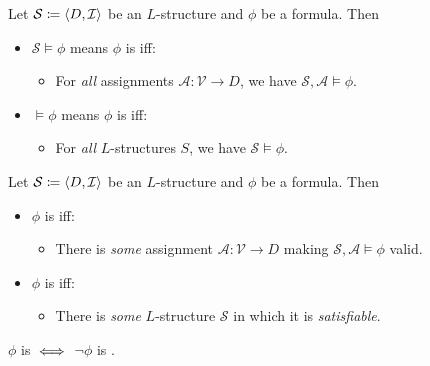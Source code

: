 \begin{definition}[Validity]
    Let $\mathcal{S} \coloneqq \langle {D, \mathcal{I}} \rangle$ be an $L$-structure 
    and $\phi$ be a formula. Then
    
    \begin{itemize}
        \item $\mathcal{S} \models \phi$ \quad means $\phi$ is
             iff:
            \begin{itemize}
                \item For \textit{all} assignments 
                    $\mathcal{A} \colon \mathcal{V} \to D$, we have 
                    $\mathcal{S}, \mathcal{A} \models \phi$.
            \end{itemize}
        \item $\models \phi$ \quad means $\phi$ is  iff:
            \begin{itemize}
                \item For \textit{all} $L$-structures $S$, we have 
                    $\mathcal{S} \models \phi$.
            \end{itemize}
    \end{itemize}
\end{definition}

\begin{definition}[Satisfiability]
    Let $\mathcal{S} \coloneqq \langle {D, \mathcal{I}} \rangle$ be an $L$-structure 
    and $\phi$ be a formula. Then
    
    \begin{itemize}
        \item $\phi$ is  iff:
            \begin{itemize}
                \item There is \textit{some} assignment 
                    $\mathcal{A} \colon \mathcal{V} \to D$ making 
                    $\mathcal{S}, \mathcal{A} \models \phi$ valid.
            \end{itemize}
        \item $\phi$ is  iff:
            \begin{itemize}
                \item There is \textit{some} $L$-structure $\mathcal{S}$ in 
                    which it is \textit{satisfiable}.
            \end{itemize}
    \end{itemize}
\end{definition}

\begin{remark}
    $\phi$ is  $\;\Longleftrightarrow\;$ $\neg \phi$ is .
\end{remark}
